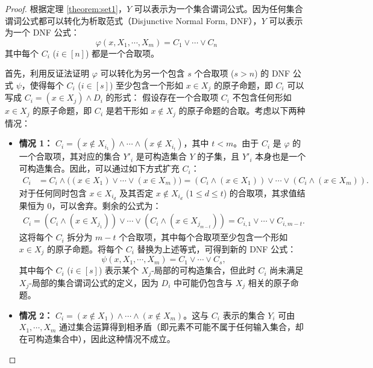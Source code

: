 \begin{proof}
根据定理 \ref{theorem:set1}，$Y$ 可以表示为一个集合谓词公式。因为任何集合谓词公式都可以转化为析取范式（Disjunctive Normal Form, DNF），$Y$ 可以表示为一个 DNF 公式：
$$\varphi(x, X_1, \cdots, X_m) = C_1 \lor \cdots \lor C_n$$
其中每个 $C_i$ ($i \in [n]$) 都是一个合取项。

首先，利用反证法证明 $\varphi$ 可以转化为另一个包含 $s$ 个合取项 ($s > n$) 的 DNF 公式 $\psi$，使得每个 $C_i$ ($i \in [s]$) 至少包含一个形如 $x \in X_j$ 的原子命题，即 $C_i$ 可以写成 $C_i = (x \in X_j) \land D_i$ 的形式：
假设存在一个合取项 $C_i$ 不包含任何形如 $x \in X_j$ 的原子命题，即 $C_i$ 是若干形如 $x \notin X_j$ 的原子命题的合取。考虑以下两种情况：
\begin{itemize}
    \item \textbf{情况 1：} $C_i = (x \notin X_{i_1}) \land \cdots \land (x \notin X_{i_{t}})$，其中 $t < m$。由于 $C_i$ 是 $\varphi$ 的一个合取项，其对应的集合 $Y'_i$ 是可构造集合 $Y$ 的子集，且 $Y'_i$ 本身也是一个可构造集合。因此，可以通过如下方式扩充 $C_i$：
    \begin{align*}
    C_i &= C_i \land \big((x \in X_1) \lor \cdots \lor (x \in X_m)\big) = (C_i \land (x \in X_1)) \lor \cdots \lor (C_i \land (x \in X_m)).
    \end{align*}
    对于任何同时包含 $x \in X_{i_d}$ 及其否定 $x \notin X_{i_d}$ ($1 \leq d \leq t$) 的合取项，其求值结果恒为 0，可以舍弃。剩余的公式为：
    \begin{align*}
    C_i = (C_i \land (x \in X_{j_1})) \lor \cdots \lor (C_i \land (x \in X_{j_{m-t}})) = C_{i,1} \lor \cdots \lor C_{i,m-t}.
    \end{align*}
    这将每个 $C_i$ 拆分为 $m-t$ 个合取项，其中每个合取项至少包含一个形如 $x \in X_j$ 的原子命题。将每个 $C_i$ 替换为上述等式，可得到新的 DNF 公式：
    $$\psi(x, X_1, \cdots, X_m) = C_1 \lor \cdots \lor C_s,$$
    其中每个 $C_i$ ($i \in [s]$) 表示某个 $X_j$-局部的可构造集合，但此时 $C_i$ 尚未满足 $X_j$-局部的集合谓词公式的定义，因为 $D_i$ 中可能仍包含与 $X_j$ 相关的原子命题。
    \item \textbf{情况 2：} $C_i = (x \notin X_1) \land \cdots \land (x \notin X_m)$。这与 $C_i$ 表示的集合 $Y_i$ 可由 $X_1, \cdots, X_m$ 通过集合运算得到相矛盾（即元素不可能不属于任何输入集合，却在可构造集合中），因此这种情况不成立。
\end{itemize}


\end{proof}
